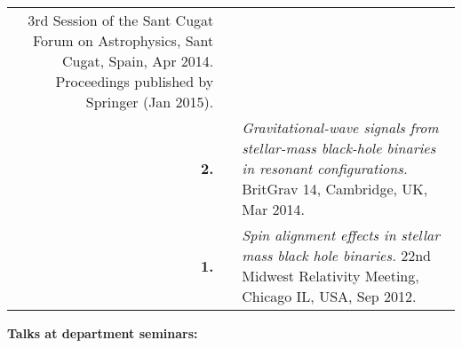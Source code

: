 \documentclass[11pt,letterpaper,sans]{moderncv}   %
\begin{document}
{\begin{longtable}{rp{0.4cm}p{15.8cm}}
\newline{} 
3rd Session of the Sant Cugat Forum on Astrophysics, Sant Cugat, Spain, Apr 2014.
\newline{} 
Proceedings published by Springer (Jan 2015).
\vspace{0.05cm}\\
\textbf{2.} & & \textit{Gravitational-wave signals from stellar-mass black-hole binaries in resonant configurations.}
\newline{} 
BritGrav 14, Cambridge, UK, Mar 2014.
\vspace{0.05cm}\\
\textbf{1.} & & \textit{Spin alignment effects in stellar mass black hole binaries.}
\newline{} 
22nd Midwest Relativity Meeting, Chicago IL, USA, Sep 2012.
\vspace{0.05cm}\\
\end{longtable}
}
\newpage{}

\textcolor{color1}{\textbf{Talks at department seminars:}}
\vspace{-0.5cm}
\end{document}
